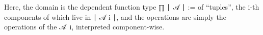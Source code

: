 \begin{code}%
\>[1]\AgdaSpace{}%
\AgdaSymbol{:}\AgdaSpace{}%
\AgdaSymbol{\{}\AgdaSpace{}%
\AgdaSymbol{:}\AgdaSpace{}%
\AgdaSymbol{\}\{}\AgdaSpace{}%
\AgdaSymbol{:}\AgdaSpace{}%
\AgdaSpace{}%
\AgdaSpace{}%
\AgdaSymbol{\}(}\AgdaSpace{}%
\AgdaSymbol{:}\AgdaSpace{}%
\AgdaSpace{}%
\AgdaSpace{}%
\AgdaSpace{}%
\AgdaSpace{}%
\AgdaSpace{}%
\AgdaSymbol{)}\AgdaSpace{}%
\AgdaSpace{}%
\AgdaSpace{}%
\AgdaSymbol{(}\AgdaSpace{}%
\AgdaSpace{}%
\AgdaSymbol{)}\AgdaSpace{}%
\<%
\\
%
\>[1]\AgdaSpace{}%
\AgdaSymbol{\{}\AgdaSymbol{\}\{}\AgdaSymbol{\}}\AgdaSpace{}%
\AgdaSpace{}%
\AgdaSymbol{=}\<%
\\
\>[1][@{}l@{\AgdaIndent{0}}]%
\>[2]\AgdaSymbol{((}\AgdaSpace{}%
\AgdaSymbol{:}\AgdaSpace{}%
\AgdaSymbol{)}\AgdaSpace{}%
\AgdaSpace{}%
\AgdaSpace{}%
\AgdaSpace{}%
\AgdaSpace{}%
\AgdaSymbol{)}\AgdaSpace{}%
\AgdaOperator{\AgdaInductiveConstructor{,}}\AgdaSpace{}%
\AgdaSpace{}%
\AgdaSymbol{:}\AgdaSpace{}%
\AgdaSpace{}%
\AgdaSpace{}%
\AgdaSymbol{)(}\AgdaSpace{}%
\AgdaSymbol{:}\AgdaSpace{}%
\AgdaSpace{}%
\AgdaSpace{}%
\AgdaSpace{}%
\AgdaSpace{}%
\AgdaSpace{}%
\AgdaSymbol{(}\AgdaSpace{}%
\AgdaSymbol{:}\AgdaSpace{}%
\AgdaSymbol{)}\AgdaSpace{}%
\AgdaSpace{}%
\AgdaSpace{}%
\AgdaSpace{}%
\AgdaSpace{}%
\AgdaSymbol{)(}\AgdaSpace{}%
\AgdaSymbol{:}\AgdaSpace{}%
\AgdaSymbol{)}\AgdaSpace{}%
\AgdaSpace{}%
\AgdaSymbol{(}\AgdaSpace{}%
\AgdaSpace{}%
\AgdaSpace{}%
\AgdaSymbol{)}\AgdaSpace{}%
\AgdaSpace{}%
\AgdaSpace{}%
\AgdaSpace{}%
\AgdaSpace{}%
\AgdaSymbol{\}}\<%
\end{code}
\ccpad
Here, the domain is the dependent function type
\af ∏ \af ∣ \ab 𝒜 \af ∣ := \AgdaSymbol{(}\AgdaSpace{}\AgdaSymbol{:}\AgdaSpace{}\AgdaSymbol{)}\AgdaSpace{}\AgdaSpace{}\AgdaSpace{}\AgdaSpace{}\AgdaSpace{}
of ``tuples'', the \ab i-th components of which live in \af ∣ \ab 𝒜 \ab i \af ∣, and the operations are simply the operations of the \ab 𝒜~\ab i, interpreted component-wise.

